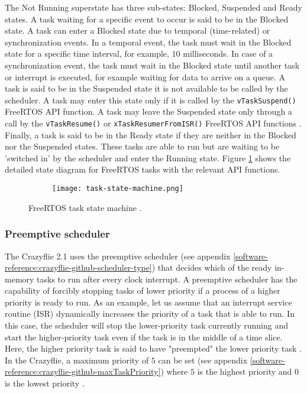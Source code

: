 \documentclass[10pt, a4paper]{article}
\newcommand{\code}[1]{\texttt{#1}}
\begin{document}
    The Not Running superstate has three sub-states: Blocked, Suspended and Ready states. A task waiting for a specific event to occur is said to be in the Blocked state. A task can enter a Blocked state due to temporal (time-related) or synchronization events. In a temporal event, the task must wait in the Blocked state for a specific time interval, for example, $10$ milliseconds. In case of a synchronization event, the task must wait in the Blocked state until another task or interrupt is executed, for example waiting for data to arrive on a queue. A task is said to be in the Suspended state it is not available to be called by the scheduler. A task may enter this state only if it is called by the \code{vTaskSuspend()} FreeRTOS API function. A task may leave the Suspended state only through a call by the \code{vTaskResume()} or \code{xTaskResumerFromISR()} FreeRTOS API functions \cite{book:freertos-guide-tasks}. Finally, a task is said to be in the Ready state if they are neither in the Blocked nor the Suspended states. These tasks are able to run but are waiting to be 'switched in' by the scheduler and enter the Running state. Figure \ref{figure:task-state-machine} shows the detailed state diagram for FreeRTOS tasks with the relevant API functions.

\begin{figure}[hbt!]
    \centering
    \begin{subfigure}[b]{0.41\textwidth}
        \centering
        \texttt{[image: task-state-machine.png]}
    \end{subfigure}
    \caption{FreeRTOS task state machine \cite{book:freertos-guide-tasks}.}
    \label{figure:task-state-machine}
\end{figure}

    \subsubsection{Preemptive scheduler}
    \label{section:preemptive-scheduler}
    The Crazyflie 2.1 uses the preemptive scheduler (see appendix \ref{software-reference:crazyflie-github-scheduler-type}) \cite{book:freertos-guide-preemptive} that decides which of the ready in-memory tasks to run after every clock interrupt. A preemptive scheduler has the capability of forcibly stopping tasks of lower priority if a process of a higher priority is ready to run. As an example, let us assume that an interrupt service routine (ISR) dynamically increases the priority of a task that is able to run. In this case, the scheduler will stop the lower-priority task currently running and start the higher-priority task even if the task is in the middle of a time slice. Here, the higher priority task is said to have "preempted" the lower priority task \cite{web:freertos-scheduling}. In the Crazyflie, a maximum priority of $5$ can be set (see appendix \ref{software-reference:crazyflie-github-maxTaskPriority}) where $5$ is the highest priority and $0$ is the lowest priority \cite{book:freertos-guide-tasks}.
\end{document}
